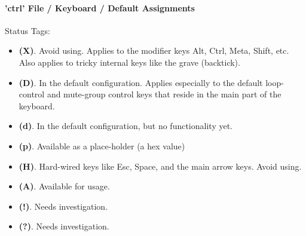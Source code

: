 %
%
%

\paragraph{'ctrl' File / Keyboard / Default Assignments}
\label{paragraph:ctrl_keyboard_default_assignments}

Status Tags:

   \begin{itemize}
      \item \textbf{(X)}.
         Avoid using.  Applies to the modifier keys Alt, Ctrl, Meta, Shift, etc.
         Also applies to tricky internal keys like the grave (backtick).
      \item \textbf{(D)}.
         In the default configuration. Applies especially to the default
         loop-control and mute-group control keys that reside in the main part of
         the keyboard.
      \item \textbf{(d)}.
         In the default configuration, but no functionality yet.
      \item \textbf{(p)}.
         Available as a place-holder (a hex value)
      \item \textbf{(H)}.
         Hard-wired keys like Esc, Space, and the main arrow keys.  Avoid using.
      \item \textbf{(A)}.
         Available for usage.
      \item \textbf{(!)}.
         Needs investigation.
      \item \textbf{(?)}.
         Needs investigation.
   \end{itemize}

